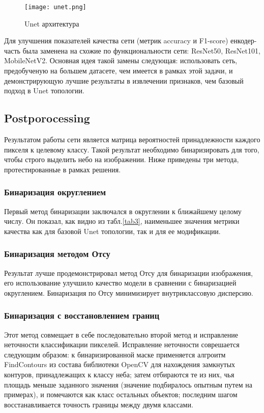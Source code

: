 \documentclass[runningheads]{llncs}
\begin{document}
{\begin{figure}[H]
\texttt{[image: unet.png]}
\caption{Unet архитектура} \label{fig1}
\end{figure}

Для улучшения показателей качества сети (метрик accuracy и
F1-score) енкодер-часть была заменена на схожие по функциональности 
сети: ResNet50\cite{resnet}, ResNet101\cite{resnet}, MobileNetV2\cite{mobnet}. Основная идея такой замены следующая: использовать сеть, предобученую на большем датасете, чем имеется в рамках этой задачи,
и демонстрирующую лучшие результаты в извлечении признаков, чем базовый подход в Unet топологии.

\subsection{Postporocessing}
Результатом работы сети является матрица вероятностей принадлежности каждого
пикселя к целевому классу. Такой результат необходимо
бинаризировать для того, чтобы строго выделить небо на изображении. Ниже приведены три метода, протестированные в рамках решения.

\subsubsection{Бинаризация округлением}
Первый метод бинаризации заключался в округлении 
к ближайшему целому числу. Он показал, как видно из табл.\ref{tab3}, наименьшее значения метрики качества как для базовой Unet топологии, так и для ее модификации. 
\subsubsection{Бинаризация методом Отсу} 
Результат лучше продемонстрировал метод Отсу для бинаризации изображения, его использование улучшило качество модели в сравнении с бинаризацией округлением. Бинаризация по Отсу минимизирует внутриклассовую дисперсию.

\subsubsection{Бинаризация с восстановлением границ} 
Этот метод совмещает в себе последовательно второй метод и исправление неточности классификации пикселей. Исправление неточности соврешается следующим образом: к бинаризированной маске применяется алгроитм FindContours из состава библиотеки OpenCV для нахождения замкнутых контуров, принадлежащих к классу неба; затем отбираются те из них, чья площадь меньше заданного значения (значение подбиралось опытным путем на примерах), и помечаются как класс остальных объектов; последним шагом восстанавливается точность границы между двумя классами.

}
\end{document}
